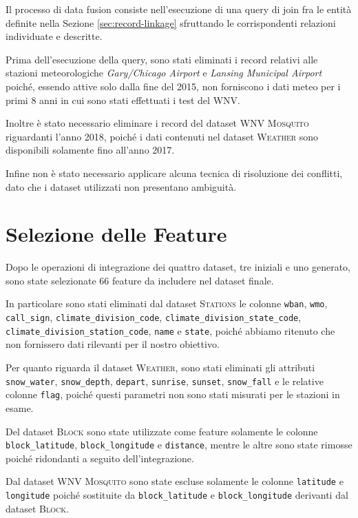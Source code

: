 Il processo di data fusion consiste nell'esecuzione di una query di join 
fra le entità definite nella Sezione \ref{sec:record-linkage} sfruttando le 
corrispondenti relazioni individuate e descritte.

Prima dell'esecuzione della query, sono stati eliminati i record relativi alle 
stazioni meteorologiche \textit{Gary/Chicago Airport} e \textit{Lansing 
	Municipal Airport} poiché, essendo attive solo dalla fine del 2015, non 
forniscono i dati meteo per i primi 8 anni in cui sono stati effettuati i 
test del WNV.

Inoltre è stato necessario eliminare i record del dataset \textsc{WNV Mosquito} 
riguardanti l'anno 2018, poiché i dati contenuti nel dataset \textsc{Weather} 
sono disponibili solamente fino all'anno 2017.

Infine non è stato necessario applicare alcuna tecnica di risoluzione dei 
conflitti, dato che i dataset utilizzati non presentano ambiguità.

\section{Selezione delle Feature}
Dopo le operazioni di integrazione dei quattro dataset, tre iniziali e uno 
generato, sono state selezionate 66 feature da includere nel dataset finale.

In particolare sono stati eliminati dal dataset \textsc{Stations} le colonne 
\texttt{wban}, \texttt{wmo}, \texttt{call\_sign}, 
\texttt{climate\_division\_code}, \texttt{climate\_division\_state\_code}, \\
\texttt{climate\_division\_station\_code}, \texttt{name} e \texttt{state}, 
poiché abbiamo ritenuto che non fornissero dati rilevanti per il nostro 
obiettivo.

Per quanto riguarda il dataset \textsc{Weather}, sono stati eliminati gli 
attributi \texttt{snow\_water}, 
\texttt{snow\_depth}, \texttt{depart}, \texttt{sunrise}, \texttt{sunset}, 
\texttt{snow\_fall} e le relative colonne \texttt{flag}, poiché questi 
parametri non sono stati misurati per le stazioni 
in esame.

Del dataset \textsc{Block} sono state utilizzate come feature solamente le 
colonne \texttt{block\_latitude}, \texttt{block\_longitude} e 
\texttt{distance}, mentre le altre sono state rimosse poiché ridondanti a 
seguito dell'integrazione.

Dal dataset \textsc{WNV Mosquito} sono state escluse solamente le colonne 
\texttt{latitude} e \texttt{longitude} poiché sostituite da 
\texttt{block\_latitude} e \texttt{block\_longitude} derivanti dal dataset  
\textsc{Block}.\\

